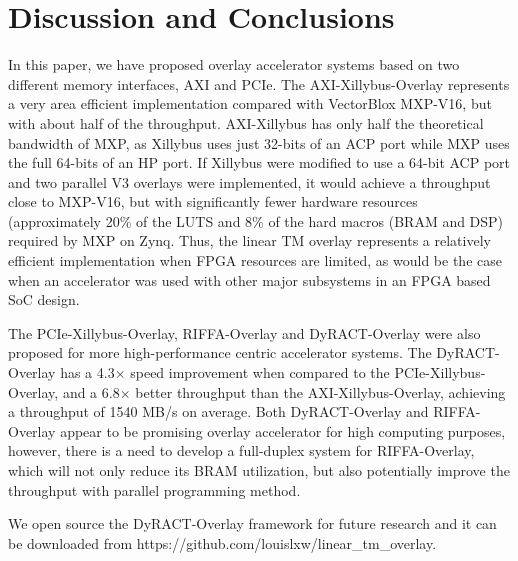 \section{Discussion and Conclusions}
In this paper, we have proposed overlay accelerator systems based on two different memory interfaces, AXI and PCIe. 
The AXI-Xillybus-Overlay represents a very area efficient implementation compared with VectorBlox MXP-V16, but with about half of the throughput. 
AXI-Xillybus has only half the theoretical bandwidth of MXP, as Xillybus uses just 32-bits of an ACP port while MXP uses the full 64-bits of an HP port. 
If Xillybus were modified to use a 64-bit ACP port and two parallel V3 overlays were implemented, it would achieve a throughput close to MXP-V16, but with significantly fewer hardware resources (approximately 20\% of the LUTS and 8\% of the hard macros (BRAM and DSP) required by MXP on Zynq.
Thus, the linear TM overlay represents a relatively efficient implementation when FPGA resources are limited, as would be the case when an accelerator was used with other major subsystems in an FPGA based SoC design.

The PCIe-Xillybus-Overlay, RIFFA-Overlay and DyRACT-Overlay were also proposed for more high-performance centric accelerator systems. 
The DyRACT-Overlay has a 4.3$\times$ speed improvement when compared to the PCIe-Xillybus-Overlay, and a 6.8$\times$ better throughput than the AXI-Xillybus-Overlay, achieving a throughput of 1540 MB/s on average. 
Both DyRACT-Overlay and RIFFA-Overlay appear to be promising overlay accelerator for high computing purposes, however, there is a need to develop a full-duplex system for RIFFA-Overlay, which will not only reduce its BRAM utilization, but also potentially improve the throughput with parallel programming method. 

We open source the DyRACT-Overlay framework for future research and it can be downloaded from https://github.com/louislxw/linear\_tm\_overlay. 